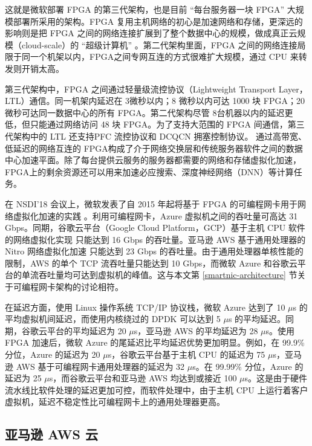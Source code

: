 这就是微软部署 FPGA 的第三代架构，也是目前 ``每台服务器一块 FPGA'' 大规模部署所采用的架构。FPGA 复用主机网络的初心是加速网络和存储，更深远的影响则是把 FPGA 之间的网络连接扩展到了整个数据中心的规模，做成真正云规模（cloud-scale）的 ``超级计算机'' \cite{configurable-cloud-acceleration}。第二代架构里面，FPGA 之间的网络连接局限于同一个机架以内，FPGA之间专网互连的方式很难扩大规模，通过 CPU 来转发则开销太高。

第三代架构中，FPGA 之间通过轻量级流控协议（Lightweight Transport Layer，LTL）通信。同一机架内延迟在 3微秒以内；8 微秒以内可达 1000 块 FPGA；20 微秒可达同一数据中心的所有 FPGA。第二代架构尽管 8台机器以内的延迟更低，但只能通过网络访问 48 块 FPGA。为了支持大范围的 FPGA 间通信，第三代架构中的 LTL 还支持PFC 流控协议和 DCQCN 拥塞控制协议。
通过高带宽、低延迟的网络互连的 FPGA构成了介于网络交换层和传统服务器软件之间的数据中心加速平面。除了每台提供云服务的服务器都需要的网络和存储虚拟化加速，FPGA上的剩余资源还可以用来加速必应搜索、深度神经网络（DNN）等计算任务。

在 NSDI'18 会议上，微软发表了自 2015 年起将基于 FPGA 的可编程网卡用于网络虚拟化加速的实践 \cite{smartnic}。利用可编程网卡，Azure 虚拟机之间的吞吐量可高达 31 Gbps。同期，谷歌云平台（Google Cloud Platform，GCP）基于主机 CPU 软件的网络虚拟化实现 \cite{andromeda} 只能达到 16 Gbps 的吞吐量。亚马逊 AWS 基于通用处理器的 Nitro 网络虚拟化加速 \cite{nitro-talk} 只能达到 23 Gbps 的吞吐量。由于通用处理器单核性能的限制，AWS 的单个 TCP 流吞吐量只能达到 10 Gbps，而微软 Azure 和谷歌云平台的单流吞吐量均可达到虚拟机的峰值。这与本文第 \ref{smartnic-architecture} 节关于可编程网卡架构的讨论相符。

在延迟方面，使用 Linux 操作系统 TCP/IP 协议栈，微软 Azure 达到了 10 $\mu$s 的平均虚拟机间延迟，而使用内核绕过的 DPDK \cite{dpdk} 可以达到 5 $\mu$s 的平均延迟。同期，谷歌云平台的平均延迟为 20 $\mu$s，亚马逊 AWS 的平均延迟为 28 $\mu$s。使用 FPGA 加速后，微软 Azure 的尾延迟比平均延迟优势更加明显。例如，在 99.9\% 分位，Azure 的延迟为 20 $\mu$s，谷歌云平台基于主机 CPU 的延迟为 75 $\mu$s，亚马逊 AWS 基于可编程网卡通用处理器的延迟为 32 $\mu$s。在 99.99\% 分位，Azure 的延迟为 25 $\mu$s，而谷歌云平台和亚马逊 AWS 均达到或接近 100 $\mu$s。这是由于硬件流水线比软件处理的延迟更加可控，而软件处理中，由于主机 CPU 上运行着客户虚拟机，延迟不稳定性比可编程网卡上的通用处理器更高。



\subsection{亚马逊 AWS 云}

